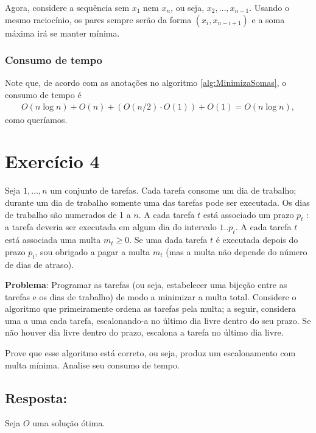 \documentclass{article}
\begin{document}
Agora, considere a sequência sem $x_1$ nem $x_n$, ou seja, $x_2, \dots, x_{n-1}$. Usando o mesmo raciocínio, os pares sempre serão da forma $(x_i,x_{n-i+1})$ e a soma máxima irá se manter mínima.

\subsubsection*{Consumo de tempo}
Note que, de acordo com as anotações no algoritmo \ref*{alg:MinimizaSomas}, o consumo de tempo é
\begin{align*}
  O(n\log n) + O(n) + (O(n/2) \cdot O(1)) + O(1) = O(n \log n) ,
\end{align*}
como queríamos.

\newpage

\section*{Exercício 4}
Seja $1,\dots, n$ um conjunto de tarefas. Cada tarefa consome um dia de trabalho; durante um dia de trabalho somente uma das tarefas pode ser executada. Os dias de trabalho são numerados de 1 a $n$. A cada tarefa $t$ está associado um prazo $p_t$
: a tarefa deveria ser executada em algum dia do intervalo $1 . . p_t$. A cada tarefa $t$ está associada uma multa $m_t \geq 0$. Se uma dada tarefa $t$ é executada depois do prazo $p_t$, sou obrigado a pagar a multa $m_t$ (mas a multa não depende do número de dias de atraso).

\textbf{Problema}: Programar as tarefas (ou seja, estabelecer uma bijeção entre as tarefas e os dias de trabalho) de modo a minimizar a multa total. Considere o algoritmo que primeiramente ordena as tarefas pela multa; a seguir, considera uma
a uma cada tarefa, escalonando-a no último dia livre dentro do seu prazo. Se não houver dia livre dentro do prazo, escalona a tarefa no último dia livre.

Prove que esse algoritmo está correto, ou seja, produz um escalonamento com multa mínima. Analise seu consumo de tempo.

\bigskip

\subsection*{Resposta:}
Seja $O$ uma solução ótima.
\end{document}
